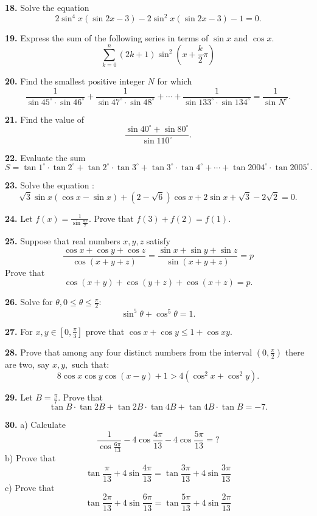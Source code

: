 \documentclass{article}
\begin{document}
\noindent
{\bf 18.} Solve the equation \[2\sin^4x(\sin 2x-3)-2\sin^2x(\sin 2x-3)-1=0.\]

\noindent
{\bf 19.} Express the sum of the following series in terms of $\sin x$ and $\cos x.$
\[\sum_{k=0}^n (2k+1)\sin ^ 2 \left(x+\frac{k}{2}\pi\right)\]

\noindent
{\bf 20.} Find the smallest positive integer $N$ for which
\[\frac{1}{\sin 45^\circ \cdot  \sin 46^\circ} + \frac{1}{\sin 47^\circ \cdot  \sin 48^\circ} +\cdots +\frac{1}{\sin 133^\circ \cdot  \sin 134^\circ} = \frac{1}{\sin N^\circ}.\]

\noindent
{\bf 21.} Find the value of
\[\frac{\sin 40^\circ + \sin 80^\circ}{\sin 110^\circ}.\]

\singlespacing
\noindent
{\bf 22.} Evaluate the sum \[ S=\tan 1^\circ  \cdot \tan 2^\circ + \tan 2^\circ  \cdot \tan 3^\circ +\tan 3^\circ  \cdot \tan 4^\circ +\cdots + \tan 2004^\circ  \cdot \tan 2005^\circ .\]


\noindent
{\bf 23.} Solve the equation :
\[ \sqrt {3} \sin x ( \cos x- \sin x ) + (2- \sqrt {6} ) \cos x+ 2 \sin x+ \sqrt {3} - 2 \sqrt {2} = 0.\]

\doublespacing
\noindent
{\bf 24.} Let $ f(x)=\frac{1}{\sin\frac{\pi x}{7}}$. Prove that $ f(3)+f(2)=f(1).$

\noindent
{\bf 25.} Suppose that real numbers $ x,y,z$ satisfy
\[ \dfrac{\cos{x}+\cos{y}+\cos{z}}{\cos{(x+y+z)}}=\dfrac{\sin{x}+\sin{y}+\sin{z}}{\sin{(x+y+z)}}=p\]
Prove that \[ \cos{(x+y)}+\cos{(y+z)}+\cos{(x+z)}=p.\]

\singlespacing
\noindent
{\bf 26.} Solve for $ \theta, 0 \le \theta \le \frac{\pi}{2}$:
\[ \sin^5 \theta + \cos^5 \theta =1.\]

\doublespacing
\noindent
{\bf 27.} For $ x,y\in [0, \frac{\pi}{3}]$ prove that $ \cos x+\cos y\leq 1+\cos xy.$

\singlespacing
\noindent
{\bf 28.} Prove that among any four distinct numbers from the interval $ (0,\frac{\pi}{2})$ there are two, say $ x,y,$ such that:
\[8 \cos x \cos y \cos (x-y)+1>4(\cos ^2 x+\cos ^2 y).\]

\noindent
{\bf 29.} Let $ B= \frac{\pi}{7}.$ Prove that
\[ \tan B \cdot \tan 2B +  \tan 2B \cdot \tan 4B + \tan 4B \cdot \tan B=-7.\]

\doublespacing
\noindent
{\bf 30.} a) Calculate
\[ \frac {1}{{\cos \frac {{6\pi }}{{13}}}} - 4\cos \frac {{4\pi }}{{13}} - 4\cos \frac {{5\pi }}{{13}} = ?
\]
b) Prove that
\[ \tan\frac {\pi }{{13}} + 4\sin \frac {{4\pi }}{{13}} = \tan\frac {{3\pi }}{{13}} + 4\sin \frac {{3\pi }}{{13}}
\]
c) Prove that
\[ \tan\frac {{2\pi }}{{13}} + 4\sin \frac {{6\pi }}{{13}} = \tan\frac {{5\pi }}{{13}} + 4\sin \frac {{2\pi }}{{13}}
\]
\end{document}
